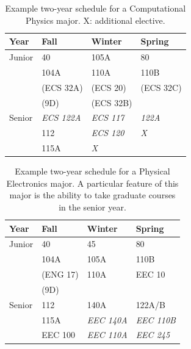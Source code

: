 \documentclass[12pt]{article}
\begin{document}
\begin{table}[htbp]
\caption{\label{tbl:sched-computational} Example two-year schedule
for a Computational Physics major.  X:  additional elective.}
\begin{center}
\begin{tabular}{|l|l|l|l|}
\hline
Year      & Fall    & Winter & Spring \\
\hline
Junior    & 40        & 105A      & 80   \\
          & 104A      & 110A      & 110B \\
          & (ECS 32A) & (ECS 20)  & (ECS 32C) \\         
          & (9D)      & (ECS 32B) & \\
\hline
Senior   & {\it ECS 122A} & {\it ECS 117} & {\it 122A} \\
         & 112          & {\it ECS 120} & {\it X} \\
         & 115A           & {\it X}      & \\
\hline
\end{tabular}
\end{center}
\end{table}

\begin{table}[htbp]
\caption{\label{tbl:sched-electronics} Example two-year schedule for a
  Physical Electronics major.  A particular feature of this major is
  the ability to take graduate courses in the senior year.}
\begin{center}
\begin{tabular}{|l|l|l|l|}
\hline
Year      & Fall    & Winter & Spring \\
\hline
Junior    & 40       & 45    & 80 \\
          & 104A     & 105A  & 110B \\
          & (ENG 17) & 110A  & EEC 10 \\
          & (9D)     &       & \\
\hline
Senior   & 112          & 140A             & 122A/B \\
         & 115A         & {\it EEC 140A}   & {\it EEC 110B} \\
         & EEC 100      & {\it EEC 110A}   & {\it EEC 245}\\
\hline
\end{tabular}
\end{center}
\end{table}
\end{document}
